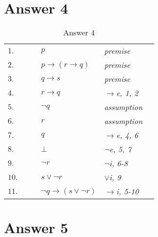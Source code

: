 \documentclass[12pt]{article}
\begin{document}
\section*{Answer 4}

\begin{table}[H]
	\centering
	\caption{Answer 4}
	\vspace{5px}
	\begin{tabular}{*6{l}}
		$1.$ & & & $p$ & \textit{premise} & \\
		
		$2.$ & & & $p \rightarrow (r \rightarrow q)$ & \textit{premise} & \\
		
		$3.$ & & & $q \rightarrow s$ & \textit{premise} & \\
		
		
		$4.$ & & & $r \rightarrow q$ & \textit{$\rightarrow$e, 1, 2} & \\
		\cline{2-6}
		
		$5.$ &\multicolumn{1}{|c}{} & & $\neg q$ &\textit{assumption} &\multicolumn{1}{c|}{}\\
		\cline{3-5}
	
		$6.$ &\multicolumn{1}{|c|}{} & & $r$ &\textit{assumption} &\multicolumn{1}{|c|}{}\\ 
		
		$7.$ &\multicolumn{1}{|c|}{} & & $q$ &\textit{$\rightarrow$e, 4, 6} &\multicolumn{1}{|c|}{}\\
		
		$8.$ &\multicolumn{1}{|c|}{} & & $\bot$
		 &\textit{$\neg$e, 5, 7} &\multicolumn{1}{|c|}{}\\
		 \cline{3-5}
		
		$9.$ &\multicolumn{1}{|c}{} & & $\neg r$ &\textit{$\neg$i, 6-8} &\multicolumn{1}{c|}{}\\
		
		$10.$ &\multicolumn{1}{|c}{} & & $s \lor \neg r$ &\textit{$\lor$i,  9} &\multicolumn{1}{c|}{}\\ 
		\cline{2-6}
		
		$11.$ & & & $\neg q \rightarrow (s \lor \neg r)$ & \textit{$\rightarrow$i, 5-10} & \\
			
	\end{tabular}
\end{table}


\section*{Answer 5}
\end{document}
